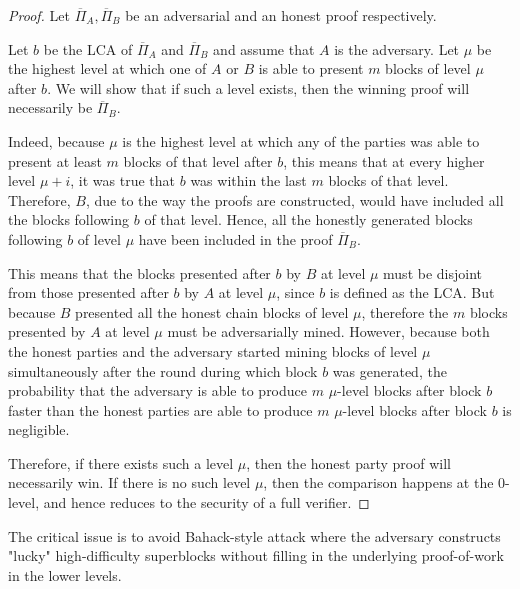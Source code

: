 \begin{proof}
    Let $\overline{\Pi}_A, \overline{\Pi}_B$ be an adversarial and an honest
    proof respectively.

    Let $b$ be the LCA of $\overline{\Pi}_A$ and $\overline{\Pi}_B$ and assume
    that $A$ is the adversary. Let $\mu$ be the highest level at which one of $A$
    or $B$ is able to present $m$ blocks of level $\mu$ after $b$. We will show
    that if such a level exists, then the winning proof will necessarily be
    $\overline{\Pi}_B$.

    Indeed, because $\mu$ is the highest level at which any of the parties was
    able to present at least $m$ blocks of that level after $b$, this means
    that at every higher level $\mu + i$, it was true that $b$ was within the
    last $m$ blocks of that level. Therefore, $B$, due to the way the proofs
    are constructed, would have included all the blocks following $b$ of that
    level. Hence, all the honestly generated blocks following $b$ of level
    $\mu$ have been included in the proof $\overline{\Pi}_B$.

    This means that the blocks presented after $b$ by $B$ at level $\mu$ must
    be disjoint from those presented after $b$ by $A$ at level $\mu$, since $b$
    is defined as the LCA. But because $B$ presented all the honest chain
    blocks of level $\mu$, therefore the $m$ blocks presented by $A$ at level
    $\mu$ must be adversarially mined.  However, because both the honest
    parties and the adversary started mining blocks of level $\mu$
    simultaneously after the round during which block $b$ was generated, the
    probability that the adversary is able to produce $m$ $\mu$-level blocks
    after block $b$ faster than the honest parties are able to produce $m$
    $\mu$-level blocks after block $b$ is negligible.

    Therefore, if there exists such a level $\mu$, then the honest party proof
    will necessarily win. If there is no such level $\mu$, then the comparison
    happens at the 0-level, and hence reduces to the security of a full
    verifier.
\end{proof}

The critical issue is to avoid Bahack-style attack \cite{bahack} where the
adversary constructs "lucky" high-difficulty superblocks without filling in
the underlying proof-of-work in the lower levels.

